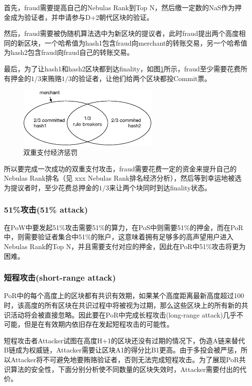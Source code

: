 首先，fraud需要提高自己的Nebulas Rank到Top N，然后缴一定数的NaS作为押金成为验证者，并申请参与D+2朝代区块的验证。

然后，fraud需要被伪随机算法选中为新区块的提议者，此时fraud提出两个高度相同的新区块，一个哈希值为hash1包含fraud向merchant的转账交易，另一个哈希值为hash2包含fraud向fraud自己的转账交易。

最后，为了让hash1和hash2区块都到达finality，如图\ref{fig:double_spend}所示，fraud至少需要花费所有押金的$1/3$来贿赂$1/3$的验证者，让他们给两个区块都投Commit票。

\begin{figure}[h]
\centering
\includegraphics[width=7cm]{./figs/overlap}
\caption{双重支付经济惩罚}
\label{fig:double_spend}
\end{figure}

所以要完成一次成功的双重支付攻击，fraud需要花费一定的资金来提升自己的Nebulas Rank排名（见 xxx Nebulas Rank排名经济分析），然后等到幸运地被选为提议者时，至少花费总押金的$1/3$来让两个块同时到达finality状态。

\subsubsection*{51\%攻击(51\% attack)}
\label{por:economic:fraud:51attack}

在PoW中要发起51\%攻击需要51\%的算力，在PoS中则需要51\%的押金，而在PoR中，则需要验证者集合中51\%的账户，这意味着拥有足够多的高声望用户进入Nebulas Rank的Top N，并且需要支付对应的押金，因此在PoR中51\%攻击将更为困难。

\subsubsection*{短程攻击(short-range attack)}
\label{por:economic:fraud:short_range_attack}

PoR中的每个高度上的区块都有共识有效期，如果某个高度距离最新高度超过100时，该高度的所有区块在共识过程中将被视为过期，那么这些区块上的所有新的共识活动将会被直接忽略。因此要在PoR中完成长程攻击(long-range attack)几乎不可能，但是在有效期内依旧存在发起短程攻击的可能性。

短程攻击者Attacker试图在高度H+1的区块还没有过期的情况下，伪造A链来替代B链成为权威链，Attacker需要让区块A1的得分比B1更高。由于多投会被严惩，所以Attacker将不可避免地要贿赂验证者，否则无法完成短程攻击。为了展现PoR共识算法的安全性，下面分别分析使不同数量的区块失效时，Attacker需要付出的代价。

